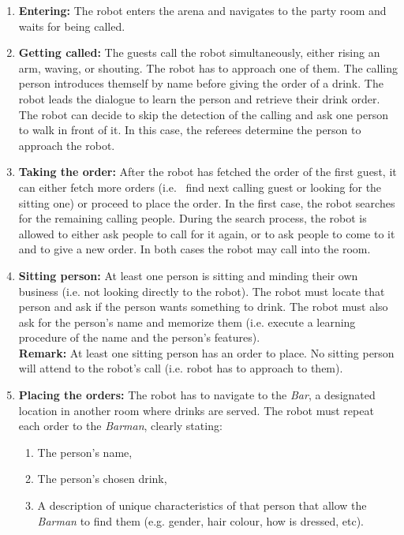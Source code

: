 \begin{enumerate}

	\item \textbf{Entering:} The robot enters the arena and navigates to the party room and waits for being called.

	\item \textbf{Getting called:} The guests call the robot simultaneously, either rising an arm, waving, or shouting. The robot has to approach one of them.
	The calling person introduces themself by name before giving the order of a drink. The robot leads the dialogue to learn the person and retrieve their drink order. \\

	The robot can decide to skip the detection of the calling and ask one person to walk in front of it. In this case, the referees determine the person to approach the robot.

	\item \textbf{Taking the order:} After the robot has fetched the order of the first guest, it can either fetch more orders (i.e.~ find next calling guest or looking for the sitting one) or proceed to place the order. In the first case, the robot searches for the remaining calling people. During the search process, the robot is allowed to either ask people to call for it again, or to ask people to come to it and to give a new order. In both cases the robot may call into the room.

	\item \textbf{Sitting person:} At least one person is sitting and minding their own business (i.e. not looking directly to the robot). The robot must locate that person and ask if the person wants something to drink. The robot must also ask for the person's name and memorize them (i.e. execute a learning procedure of the name and the person's features). \\

	\textbf{Remark:} At least one sitting person has an order to place. No sitting person will attend to the robot's call
	(i.e. robot has to approach to them).

	\item \textbf{Placing the orders:} The robot has to navigate to the \textit{Bar}, a designated location in another room where drinks are served. The robot must repeat each order to the \textit{Barman}, clearly stating:
	\begin{enumerate}
		\item The person's name,
		\item The person's chosen drink,
		\item A description of unique characteristics of that person that allow the \textit{Barman} to find them (e.g. gender, hair colour, how is dressed, etc).
	\end{enumerate}


\end{enumerate}
